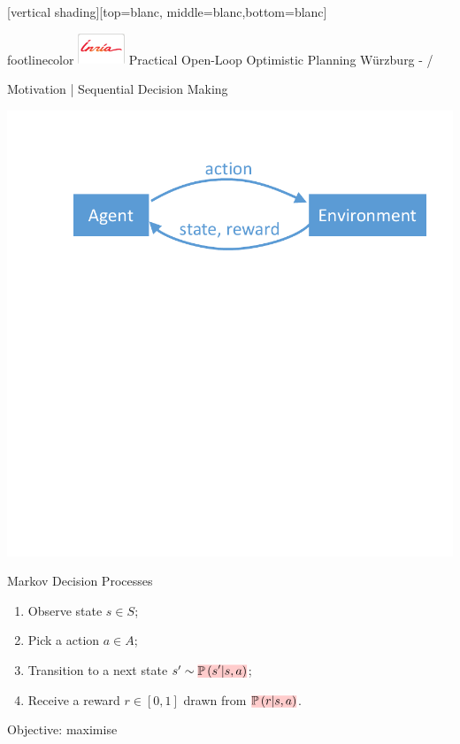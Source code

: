 \documentclass{beamer}
\begin{document}
[vertical shading][top=blanc, middle=blanc,bottom=blanc]
{
\begin{beamercolorbox}[wd=1\paperwidth,ht=15.5pt]{footlinecolor}
		\hspace{3mm}
		\includegraphics[width=14mm]{inria/logobastrans}
		\hspace{.4cm}
		\raisebox{3.2ex}
		{\scriptsize Practical Open-Loop Optimistic Planning}\hfill
		\raisebox{3.2ex}
		{Würzburg - \insertframenumber/\inserttotalframenumber \hspace{5mm}
			\null }
\end{beamercolorbox}
}

\begin{frame}{Motivation | Sequential Decision Making}
\begin{center}
    \includegraphics[trim=0 275 0 25,clip, width=0.75\linewidth]{img/diagram1.pdf}
\end{center}

\begin{block}{Markov Decision Processes}
\begin{enumerate}
    \item Observe state $s\in S$;
    \item Pick a  action $a\in A$;
    \item Transition to a next state $s'\sim \hler{\probability{s'|s,a}}$;
    \item Receive a  reward $r\in[0, 1]$ drawn from $\hler{\probability{r|s, a}}$.
\end{enumerate}
\begin{center}
    Objective: maximise 
\end{center}
\end{block}
\end{frame}
\end{document}
